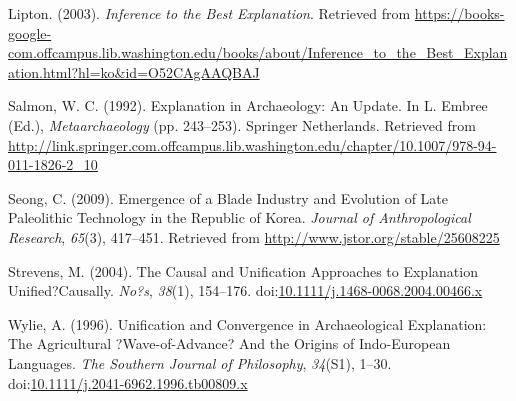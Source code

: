 \documentclass[american,man]{apa6}
\begin{document}
Lipton. (2003). \emph{Inference to the Best Explanation}. Retrieved from
\url{https://books-google-com.offcampus.lib.washington.edu/books/about/Inference_to_the_Best_Explanation.html?hl=ko\&id=O52CAgAAQBAJ}

Salmon, W. C. (1992). Explanation in Archaeology: An Update. In L.
Embree (Ed.), \emph{Metaarchaeology} (pp. 243--253). Springer
Netherlands. Retrieved from
\url{http://link.springer.com.offcampus.lib.washington.edu/chapter/10.1007/978-94-011-1826-2_10}

Seong, C. (2009). Emergence of a Blade Industry and Evolution of Late
Paleolithic Technology in the Republic of Korea. \emph{Journal of
Anthropological Research}, \emph{65}(3), 417--451. Retrieved from
\url{http://www.jstor.org/stable/25608225}

Strevens, M. (2004). The Causal and Unification Approaches to
Explanation Unified?Causally. \emph{No?s}, \emph{38}(1), 154--176.
doi:\href{http://dx.doi.org/10.1111/j.1468-0068.2004.00466.x}{10.1111/j.1468-0068.2004.00466.x}

Wylie, A. (1996). Unification and Convergence in Archaeological
Explanation: The Agricultural ?Wave-of-Advance? And the Origins of
Indo-European Languages. \emph{The Southern Journal of Philosophy},
\emph{34}(S1), 1--30.
doi:\href{http://dx.doi.org/10.1111/j.2041-6962.1996.tb00809.x}{10.1111/j.2041-6962.1996.tb00809.x}
\end{document}
